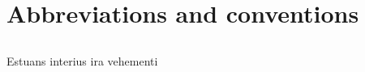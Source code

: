 \chapter*{Abbreviations and conventions}
\label{chapter:conventions}
\section*{}
\singlespacing

Estuans interius ira vehementi